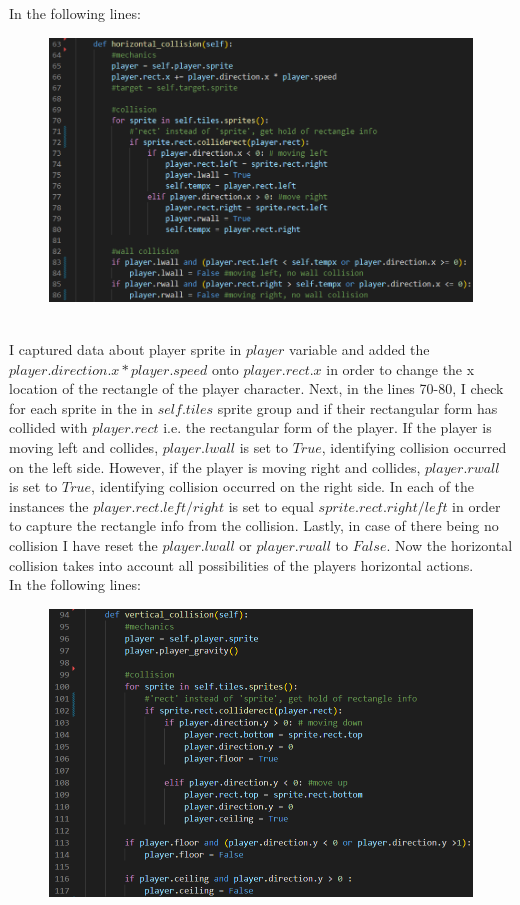\documentclass[12pt]{article}
\begin{document}
\newpage
In the following lines:\\
\begin{figure}[H]
    \includegraphics[width = 15cm]{Level class/horcoll.png}
    \centering
\end{figure}\\
I captured data about player sprite in $player$ variable and added the $player.direction.x * player.speed$ onto $player.rect.x$ in order to change the x location of the rectangle of the player character. Next, in the lines 70-80, I check for each sprite in the in $self.tiles$ sprite group and if their rectangular form has collided with $player.rect$ i.e. the rectangular form of the player. If the player is moving left and collides, $player.lwall$ is set to $True$, identifying collision occurred on the left side. However, if the player is moving right and collides, $player.rwall$ is set to $True$, identifying collision occurred on the right side. In each of the instances the $player.rect.left/right$ is set to equal $sprite.rect.right/left$ in order to capture the rectangle info from the collision. Lastly, in case of there being no collision I have reset the $player.lwall$ or $player.rwall$ to $False$. Now the horizontal collision takes into account all possibilities of the players horizontal actions.\\
\newpage
In the following lines:\\
\begin{figure}[H]
    \includegraphics[width = 16cm]{Level class/vercoll.png}
    \centering
\end{figure}\\
\end{document}

